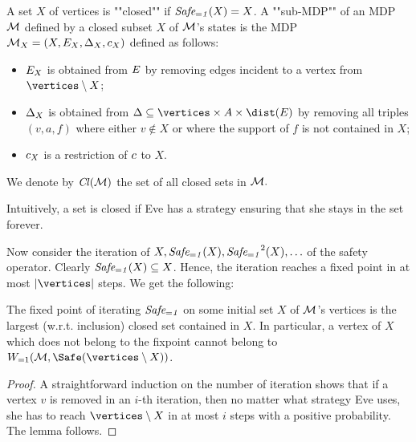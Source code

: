 \begin{definition}
A set $X$ of vertices is ""closed"" if $ \mathit{Safe_{=1}}(X)=X$. A ""sub-MDP"" of an MDP $ \mathcal{M} $ defined by a closed subset $X$ of $ \mathcal{M} $'s states is the MDP $\mathcal{M}_X = (X,E_X,\Delta_X,c_X)$ defined as follows:
\begin{itemize}
	\item $E_X$ is obtained from $E$ by removing edges incident to a vertex from $\vertices\setminus X$;
	\item $\Delta_X$ is obtained from $\probTranFunc\subseteq \vertices\times\actions\times\dist(\edges)$ by removing all triples $(v,a,f)$ where either $v\not \in X$ or where the support of $f$ is not contained in $X$;
	\item $c_X$ is a restriction of $c$ to $X$.
\end{itemize}
We denote by $\mathit{Cl}(\mathcal{M})$ the set of all closed sets in $\mathcal{M}.$
\end{definition}

Intuitively, a set is closed if Eve has a strategy ensuring that she stays in the set forever.



Now consider the iteration of $ X, \mathit{Safe_{=1}}(X),\mathit{Safe_{=1}}^2(X),\ldots $ of the safety operator. Clearly $\mathit{Safe_{=1}}(X)\subseteq X$. Hence, the iteration reaches a fixed point in at most $|\vertices|$ steps. We get the following:

\begin{lemma}
\label{5-lem:safety-iteration}
The fixed point of iterating $ \mathit{Safe_{=1}} $ on some initial set $ X $ of $ \mathcal{M} $'s vertices is the largest (w.r.t. inclusion) closed set contained in $ X $. In particular, a vertex of $ X $ which does not belong to the fixpoint cannot belong to  $\winAS(\mdp,\Safe(\vertices \setminus X))$.
\end{lemma}
\begin{proof}
A straightforward induction on the number of iteration shows that if a vertex $ v $ is removed in an $ i $-th iteration, then no matter what strategy Eve uses, she has to reach $ \vertices\setminus X $ in at most $ i $ steps with a positive probability. The lemma follows.
\end{proof}


%



